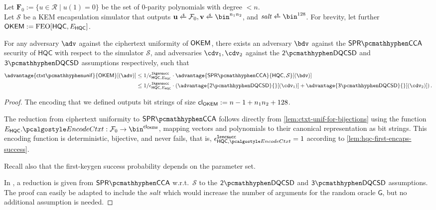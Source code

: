 \begin{lemma}
\label{lem:hqc-ctxt-unif}
    Let $\mathbf F_0 := \{u \in \mathcal R \mid u(1) = 0 \}$ be the set of 0-parity polynomials with degree $<n$.\\
    Let $\mathcal S$ be a KEM encapsulation simulator that outputs $\mathbf u \getsr \mathcal F_0, \mathbf v \getsr \bin^{n_1n_2}$, and $\mathit{salt} \getsr \bin^{128}$.
    For brevity, let further $\mathsf{OKEM} := \textsf{\textnormal{FEO}}[\mathsf{HQC}, E_\mathsf{HQC}]$.

    For any adversary $\adv$ against the ciphertext uniformity of $\mathsf{OKEM}$, there exists an adversary $\bdv$ against the $\sprcca$ security of $\mathsf{HQC}$ with respect to the simulator $\mathcal S$, and adversaries $\cdv_1, \cdv_2$ against the $\twodqcsd$ and $\threedqcsd$ assumptions respectively, such that
    \begin{align*}
        \advantage{\ctxtunif}{\OKEM}[(\adv)]
        &\leq 1/\epsilon^\firstkeygensuccess_{\mathsf{HQC}, E_\mathsf{HQC}} \cdot \advantage{\sprcca}{\mathsf{HQC},\mathcal S}[(\bdv)] \\
        &\leq 1/\epsilon^\firstkeygensuccess_{\mathsf{HQC}, E_\mathsf{HQC}} \cdot \left(
            \advantage{\twodqcsd}{}[(\cdv_1)] + \advantage{\threedqcsd}{}[(\cdv_2)]
        \right).
    \end{align*}
\end{lemma}
\begin{proof}
    The encoding that we defined outputs bit strings of size ${\mathsf{cl}_{\mathsf{OKEM}}} := n-1+n_1n_2+128$.

    The reduction from ciphertext uniformity to $\sprcca$ follows directly from \cref{lem:ctxt-unif-for-bijections} using the function $E_\mathsf{HQC}.\encodectxt: \mathcal F_0 \to \bin^\obfctxtlen$, mapping vectors and polynomials to their canonical representation as bit strings.
    This encoding function is deterministic, bijective, and never fails, that is, $\epsilon^\firstencapssuccess_{\mathsf{HQC},\encodectxt} = 1$ according to \cref{lem:hqc-first-encaps-success}.

    Recall also that the first-keygen success probability depends on the parameter set.

    In \cite[Lemma~P.2]{EC:Xagawa22}, a reduction is given from $\sprcca$ w.r.t.~$\mathcal S$ to the $\twodqcsd$ and $\threedqcsd$ assumptions. The proof can easily be adapted to include the $\mathit{salt}$ which would increase the number of arguments for the random oracle $\mathsf G$, but no additional assumption is needed.
\end{proof}

